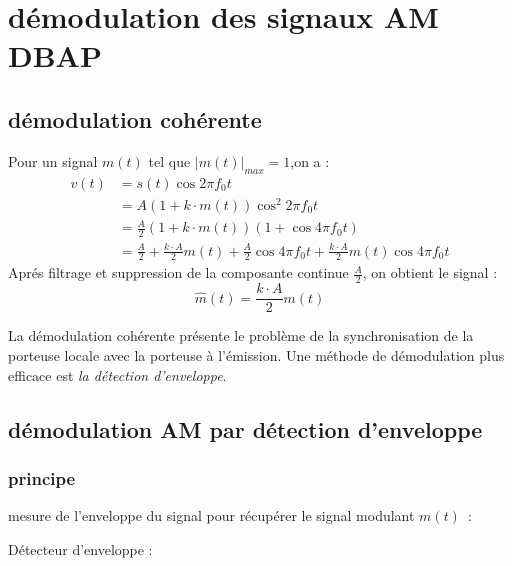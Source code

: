 \documentclass[12pt,a4paper,hidelinks,oneside]{book}
\begin{document}
\section{démodulation des signaux AM DBAP}
\subsection{démodulation cohérente}
Pour un signal $m\left(t\right)$ tel que $|m\left(t\right)|_{max}=1$,on a : 
\begin{displaymath}
\begin{aligned}
v(t) &=s(t) \cos 2 \pi f_{0} t \\
&=A(1+k \cdot m(t)) \cos ^{2} 2 \pi f_{0} t \\
&=\frac{A}{2}(1+k \cdot m(t))\left(1+\cos 4 \pi f_{0} t\right) \\
&=\frac{A}{2}+\frac{k \cdot A}{2} m(t)+\frac{A}{2} \cos 4 \pi f_{0} t+\frac{k \cdot A}{2} m(t) \cos 4 \pi f_{0} t
\end{aligned}
\end{displaymath}
Aprés filtrage et suppression de la composante continue $\frac{A}{2}$, on obtient le signal  :
\begin{equation}
\hat{m}\left(t\right)=\frac{k \cdot A}{2}m\left(t\right)
\end{equation}

La démodulation cohérente présente le problème de la synchronisation de la porteuse locale avec la
porteuse à l’émission. Une méthode de démodulation plus efficace est \textit{la détection d’enveloppe}.

\subsection{démodulation AM par détection d’enveloppe}
\subsubsection*{principe}

mesure de l’enveloppe du signal pour récupérer le signal modulant \mbox{$m\left(t\right)$ :}

Détecteur d’enveloppe :

\end{document}
